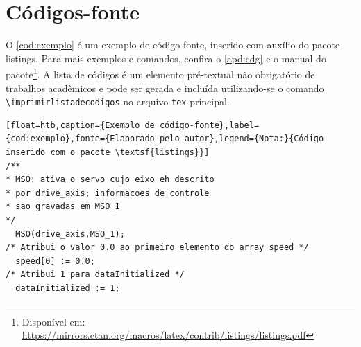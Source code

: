 \section{Códigos-fonte}

O \cref{cod:exemplo} é um exemplo de código-fonte, inserido com auxílio do pacote \textsf{listings}. Para mais exemplos e comandos, confira o \cref{apd:cdg} e o manual do pacote\footnote{Disponível em: \url{https://mirrors.ctan.org/macros/latex/contrib/listings/listings.pdf}}. A lista de códigos é um elemento pré-textual não obrigatório de trabalhos acadêmicos e pode ser gerada e incluída utilizando-se o comando \verb|\imprimirlistadecodigos| no arquivo \texttt{tex} principal.

\begin{lstlisting}[float=htb,caption={Exemplo de código-fonte},label={cod:exemplo},fonte={Elaborado pelo autor},legend={Nota:}{Código inserido com o pacote \textsf{listings}}]
/**
* MSO: ativa o servo cujo eixo eh descrito
* por drive_axis; informacoes de controle
* sao gravadas em MSO_1
*/
  MSO(drive_axis,MSO_1);
/* Atribui o valor 0.0 ao primeiro elemento do array speed */
  speed[0] := 0.0; 
/* Atribui 1 para dataInitialized */
  dataInitialized := 1;
\end{lstlisting}
